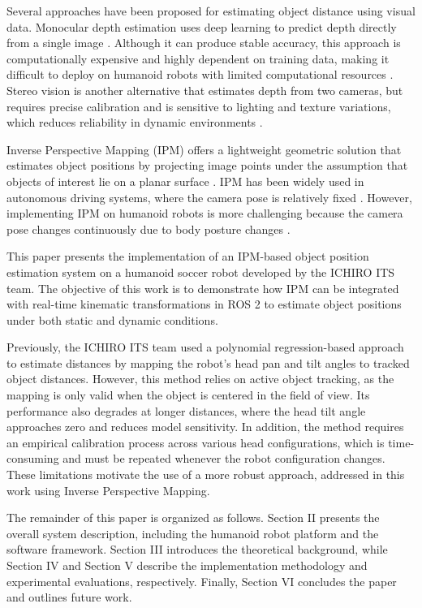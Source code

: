 \documentclass[journal]{IAENGtran}
\begin{document}
Several approaches have been proposed for estimating object distance using visual data. Monocular depth estimation uses
deep learning to predict depth directly from a single image \cite{Zhang2025}. Although
it can produce stable accuracy, this approach is computationally expensive and highly dependent on training
data, making it difficult to deploy on humanoid robots with limited computational resources \cite{Wofk2019}.
Stereo vision is another alternative that estimates depth from two cameras, but requires precise calibration
and is sensitive to lighting and texture variations, which reduces reliability in dynamic environments \cite{Kok2019}.

Inverse Perspective Mapping (IPM) offers a lightweight geometric solution that estimates
object positions by projecting image points under the assumption that objects of interest lie on a planar surface \cite{Li2024}.
IPM has been widely used in autonomous driving systems, where the camera pose is relatively fixed \cite{Bertozzi1998}.
However, implementing IPM on humanoid robots is more challenging because the camera pose changes continuously due
to body posture changes \cite{daSilva2024}.

This paper presents the implementation of an IPM-based object position estimation system on a
humanoid soccer robot developed by the ICHIRO ITS team. The objective of this work is to demonstrate
how IPM can be integrated with real-time kinematic transformations in ROS 2 to estimate object positions
under both static and dynamic conditions.

Previously, the ICHIRO ITS team used a polynomial regression-based
approach to estimate distances by mapping the robot's head pan and tilt
angles to tracked object distances. However, this method relies on active
object tracking, as the mapping is only valid when the object is centered
in the field of view. Its performance also degrades at longer distances,
where the head tilt angle approaches zero and reduces model sensitivity.
In addition, the method requires an empirical calibration process across
various head configurations, which is time-consuming and must be repeated
whenever the robot configuration changes. These limitations motivate the
use of a more robust approach, addressed in this work using Inverse
Perspective Mapping.

The remainder of this paper is organized as follows. Section II presents
the overall system description, including the humanoid robot platform and
the software framework. Section III introduces the theoretical background,
while Section IV and Section V describe the implementation methodology and
experimental evaluations, respectively. Finally, Section VI concludes the
paper and outlines future work.
\end{document}
